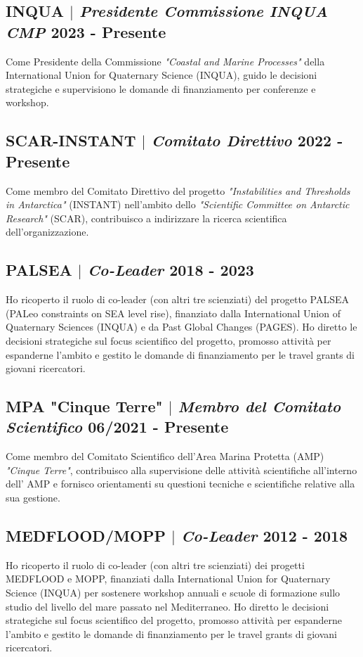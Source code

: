 \documentclass[11pt]{article}
\begin{document}
\subsection{INQUA $|$ {\normalfont\textit{Presidente Commissione INQUA CMP}} \hfill 2023 - Presente}
{\footnotesize Come Presidente della Commissione \textit{"Coastal and Marine Processes"} della International Union for Quaternary Science (INQUA), guido le decisioni strategiche e supervisiono le domande di finanziamento per conferenze e workshop.}
\bigskip

\subsection{SCAR-INSTANT $|$ {\normalfont\textit{Comitato Direttivo}} \hfill 2022 - Presente}
{\footnotesize Come membro del Comitato Direttivo del progetto \textit{"Instabilities and Thresholds in Antarctica"} (INSTANT) nell'ambito dello \textit{"Scientific Committee on Antarctic Research"} (SCAR), contribuisco a indirizzare la ricerca scientifica dell'organizzazione.}
\bigskip

\subsection{PALSEA $|$ {\normalfont\textit{Co-Leader}} \hfill 2018 - 2023}
{\footnotesize Ho ricoperto il ruolo di co-leader (con altri tre scienziati) del progetto PALSEA (PALeo constraints on SEA level rise), finanziato dalla International Union of Quaternary Sciences (INQUA) e da Past Global Changes (PAGES). Ho diretto le decisioni strategiche sul focus scientifico del progetto, promosso attività per espanderne l'ambito e gestito le domande di finanziamento per le travel grants di giovani ricercatori.}
\bigskip

\subsection{MPA "Cinque Terre" $|$ {\normalfont\textit{Membro del Comitato Scientifico}} \hfill 06/2021 - Presente}
{\footnotesize Come membro del Comitato Scientifico dell'Area Marina Protetta (AMP) \textit{"Cinque Terre"}, contribuisco alla supervisione delle attività scientifiche all'interno dell' AMP e fornisco orientamenti su questioni tecniche e scientifiche relative alla sua gestione.}
\bigskip

\subsection{MEDFLOOD/MOPP $|$ {\normalfont\textit{Co-Leader}} \hfill 2012 - 2018}
{\footnotesize Ho ricoperto il ruolo di co-leader (con altri tre scienziati) dei progetti MEDFLOOD e MOPP, finanziati dalla International Union for Quaternary Science (INQUA) per sostenere workshop annuali e scuole di formazione sullo studio del livello del mare passato nel Mediterraneo. Ho diretto le decisioni strategiche sul focus scientifico del progetto, promosso attività per espanderne l'ambito e gestito le domande di finanziamento per le travel grants di giovani ricercatori.}
\end{document}
